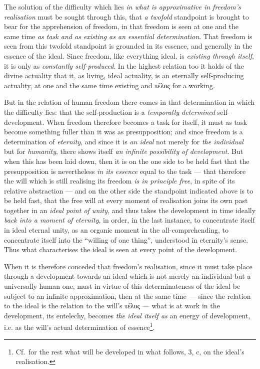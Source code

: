 \documentclass[12pt,a4paper]{book}
\begin{document}
The solution of the difficulty which lies \emph{in what is approximative in
freedom's realisation} must be sought through this, that \emph{a twofold}
standpoint is brought to bear for the apprehension of freedom, in that freedom
is seen at one and the same time \emph{as task and as existing as an essential
determination}. That freedom is seen from this twofold standpoint is grounded
in its essence, and generally in the essence of the ideal. Since freedom, like
everything ideal, is \emph{existing through itself}, it is only as
\emph{constantly self-produced}. In the highest relation too it holds of the
divine actuality that it, as living, ideal actuality, is an eternally
self-producing actuality, at one and the same time existing and τέλος for a
working.

\setcounter{footnote}{0}%
But in the relation of human freedom there comes in that determination in which
the difficulty lies: that the self-production is a \emph{temporally determined}
self-development. When freedom therefore becomes a task for itself, it must as
task become something fuller than it was as presupposition; and since freedom
is a determination of \emph{eternity}, and since it is \emph{an ideal} not
merely for \emph{the individual} but for \emph{humanity}, there shows itself
\emph{an infinite possibility of development}. But when this has been laid
down, then it is on the one side to be held fast that the presupposition is
nevertheless \emph{in its essence} equal to the task --- that therefore the
will which is still realising its freedom \emph{is in principle free}, in spite
of its relative abstraction --- and on the other side the standpoint indicated
above is to be held fast, that the free will at every moment of realisation
joins its own past together in an \emph{ideal point of unity}, and thus takes
the development in time ideally \emph{back into a moment of eternity}, in order,
in the last instance, to concentrate itself in ideal eternal unity, as an
organic moment in the all-comprehending, to concentrate itself into the ``willing
of one thing'', understood in eternity's sense. Thus what characterises the
ideal is seen at every point of the development.

When it is therefore conceded that freedom's realisation, since it must take
place through a development towards an ideal which is not merely an individual
but a universally human one, must in virtue of this determinateness of the
ideal be subject to an infinite approximation, then at the same time --- since
the relation to the ideal is the relation to the will's τέλος --- what is at
work in the development, its entelechy, becomes \emph{the ideal itself as} an
energy of development, i.e. as the will's actual determination of
essence\footnote{Cf.\ for the rest what will be developed in what follows,
3, c, on the ideal's realisation.}.
\end{document}

